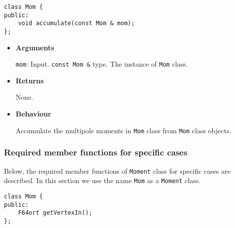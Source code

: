 
\begin{screen}
\begin{verbatim}
class Mom {
public:
    void accumulate(const Mom & mom);
};
\end{verbatim}
\end{screen}

\begin{itemize}

\item {\bf Arguments}

  \texttt{mom}: Input. \texttt{const Mom \&} type. The instance of \texttt{Mom} class.

\item {\bf Returns}

  None.

\item {\bf Behaviour}

  Accumulate the multipole moments in \texttt{Mom} class from \texttt{Mom} class objects.

\end{itemize}

\subsubsection{Required member functions for specific cases}


Below, the required member functions of \texttt{Moment} class for specific cases are described. In this section we use the name \texttt{Mom} as a \texttt{Moment} class.


\begin{screen}
\begin{verbatim}
class Mom {
public:
    F64ort getVertexIn();
};
\end{verbatim}
\end{screen}

